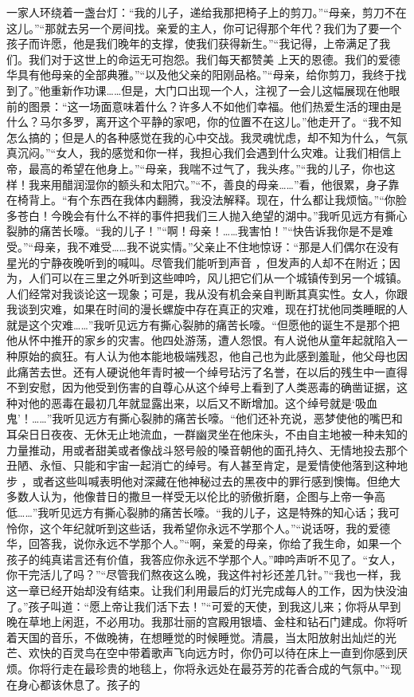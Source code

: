 \documentclass{article}
\begin{document}
一家人环绕着一盏台灯：“我的儿子，递给我那把椅子上的剪刀。”“母亲，剪刀不在这儿。”“那就去另一个房间找。亲爱的主人，你可记得那个年代？我们为了要一个孩子而许愿，他是我们晚年的支撑，使我们获得新生。”“我记得，上帝满足了我们。我们对于这世上的命运无可抱怨。我们每天都赞美
\newpage
上天的恩德。我们的爱德华具有他母亲的全部典雅。”“以及他父亲的阳刚品格。”“母亲，给你剪刀，我终于找到了。”他重新作功课……但是，大门口出现一个人，注视了一会儿这幅展现在他眼前的图景：“这一场面意味着什么？许多人不如他们幸福。他们热爱生活的理由是什么？马尔多罗，离开这个平静的家吧，你的位置不在这儿。”他走开了。“我不知怎么搞的；但是人的各种感觉在我的心中交战。我灵魂忧虑，却不知为什么，气氛真沉闷。”“女人，我的感觉和你一样，我担心我们会遇到什么灾难。让我们相信上帝，最高的希望在他身上。”“母亲，我喘不过气了，我头疼。”“我的儿子，你也这样！我来用醋润湿你的额头和太阳穴。”“不，善良的母亲……”看，他很累，身子靠在椅背上。“有个东西在我体内翻腾，我没法解释。现在，什么都让我烦恼。”“你脸多苍白！今晚会有什么不祥的事件把我们三人抛入绝望的湖中。”我听见远方有撕心裂肺的痛苦长嚎。“我的儿子！”“啊！母亲！……我害怕！”“快告诉我你是不是难受。”“母亲，我不难受……我不说实情。”父亲止不住地惊讶：“那是人们偶尔在没有星光的宁静夜晚听到的喊叫。尽管我们能听到声音
\newpage
，但发声的人却不在附近；因为，人们可以在三里之外听到这些呻吟，风儿把它们从一个城镇传到另一个城镇。人们经常对我谈论这一现象；可是，我从没有机会亲自判断其真实性。女人，你跟我谈到灾难，如果在时间的漫长螺旋中存在真正的灾难，现在打扰他同类睡眠的人就是这个灾难……”我听见远方有撕心裂肺的痛苦长嚎。“但愿他的诞生不是那个把他从怀中推开的家乡的灾害。他四处游荡，遭人怨恨。有人说他从童年起就陷入一种原始的疯狂。有人认为他本能地极端残忍，他自己也为此感到羞耻，他父母也因此痛苦去世。还有人硬说他年青时被一个绰号玷污了名誉，在以后的残生中一直得不到安慰，因为他受到伤害的自尊心从这个绰号上看到了人类恶毒的确凿证据，这种对他的恶毒在最初几年就显露出来，以后又不断增加。这个绰号就是‘吸血鬼’！……”我听见远方有撕心裂肺的痛苦长嚎。“他们还补充说，恶梦使他的嘴巴和耳朵日日夜夜、无休无止地流血，一群幽灵坐在他床头，不由自主地被一种未知的力量推动，用或者甜美或者像战斗怒号般的嗓音朝他的面孔持久、无情地投去那个丑陋、永恒、只能和宇宙一起消亡的绰号。有人甚至肯定，是爱情使他落到这种地步
\newpage
，或者这些叫喊表明他对深藏在他神秘过去的黑夜中的罪行感到懊悔。但绝大多数人认为，他像昔日的撒旦一样受无以伦比的骄傲折磨，企图与上帝一争高低……”我听见远方有撕心裂肺的痛苦长嚎。“我的儿子，这是特殊的知心话；我可怜你，这个年纪就听到这些话，我希望你永远不学那个人。”“说话呀，我的爱德华，回答我，说你永远不学那个人。”“啊，亲爱的母亲，你给了我生命，如果一个孩子的纯真诺言还有价值，我答应你永远不学那个人。”呻吟声听不见了。“女人，你干完活儿了吗？”“尽管我们熬夜这么晚，我这件衬衫还差几针。”“我也一样，我这一章已经开始却没有结束。让我们利用最后的灯光完成每人的工作，因为快没油了。”孩子叫道：“愿上帝让我们活下去！”“可爱的天使，到我这儿来；你将从早到晚在草地上闲逛，不必用功。我那壮丽的宫殿用银墙、金柱和钻石门建成。你将听着天国的音乐，不做晚祷，在想睡觉的时候睡觉。清晨，当太阳放射出灿烂的光芒、欢快的百灵鸟在空中带着歌声飞向远方时，你仍可以待在床上一直到你感到厌烦。你将行走在最珍贵的地毯上，你将永远处在最芬芳的花香合成的气氛中。”“现在身心都该休息了。孩子的
\end{document}
